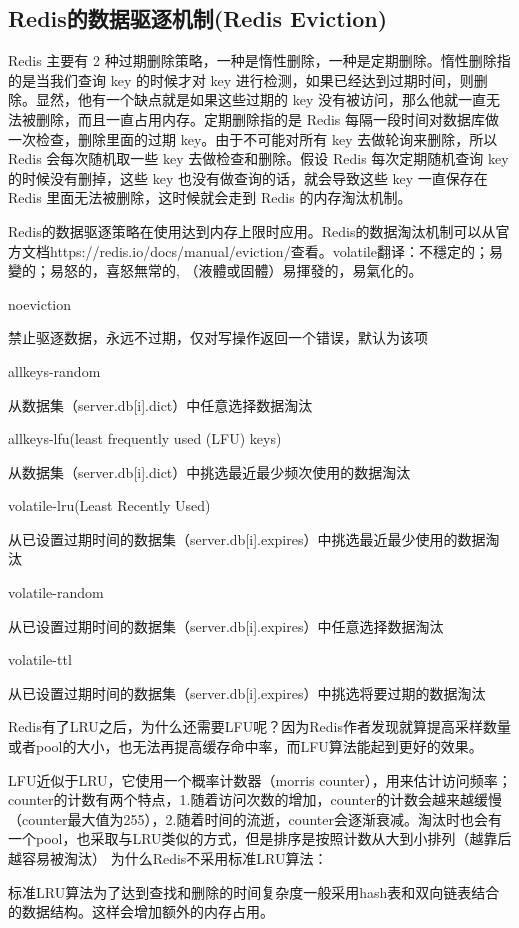 \documentclass[../../../interview-questions.tex]{subfiles}
\begin{document}
\subsection{Redis的数据驱逐机制(Redis Eviction)}

Redis 主要有 2 种过期删除策略，一种是惰性删除，一种是定期删除。惰性删除指的是当我们查询 key 的时候才对 key 进行检测，如果已经达到过期时间，则删除。显然，他有一个缺点就是如果这些过期的 key 没有被访问，那么他就一直无法被删除，而且一直占用内存。定期删除指的是 Redis 每隔一段时间对数据库做一次检查，删除里面的过期 key。由于不可能对所有 key 去做轮询来删除，所以 Redis 会每次随机取一些 key 去做检查和删除。假设 Redis 每次定期随机查询 key 的时候没有删掉，这些 key 也没有做查询的话，就会导致这些 key 一直保存在 Redis 里面无法被删除，这时候就会走到 Redis 的内存淘汰机制。

Redis的数据驱逐策略在使用达到内存上限时应用。Redis的数据淘汰机制可以从官方文档https://redis.io/docs/manual/eviction/查看。volatile翻译：不穩定的；易變的；易怒的，喜怒無常的, （液體或固體）易揮發的，易氣化的。

noeviction

禁止驱逐数据，永远不过期，仅对写操作返回一个错误，默认为该项

allkeys-random

从数据集（server.db[i].dict）中任意选择数据淘汰

allkeys-lfu(least frequently used (LFU) keys)

从数据集（server.db[i].dict）中挑选最近最少频次使用的数据淘汰

volatile-lru(Least Recently Used)

从已设置过期时间的数据集（server.db[i].expires）中挑选最近最少使用的数据淘汰

volatile-random

从已设置过期时间的数据集（server.db[i].expires）中任意选择数据淘汰

volatile-ttl

从已设置过期时间的数据集（server.db[i].expires）中挑选将要过期的数据淘汰


Redis有了LRU之后，为什么还需要LFU呢？因为Redis作者发现就算提高采样数量或者pool的大小，也无法再提高缓存命中率，而LFU算法能起到更好的效果。

LFU近似于LRU，它使用一个概率计数器（morris counter），用来估计访问频率；counter的计数有两个特点，1.随着访问次数的增加，counter的计数会越来越缓慢（counter最大值为255），2.随着时间的流逝，counter会逐渐衰减。淘汰时也会有一个pool，也采取与LRU类似的方式，但是排序是按照计数从大到小排列（越靠后越容易被淘汰）
为什么Redis不采用标准LRU算法：

标准LRU算法为了达到查找和删除的时间复杂度一般采用hash表和双向链表结合的数据结构。这样会增加额外的内存占用。
\end{document}

